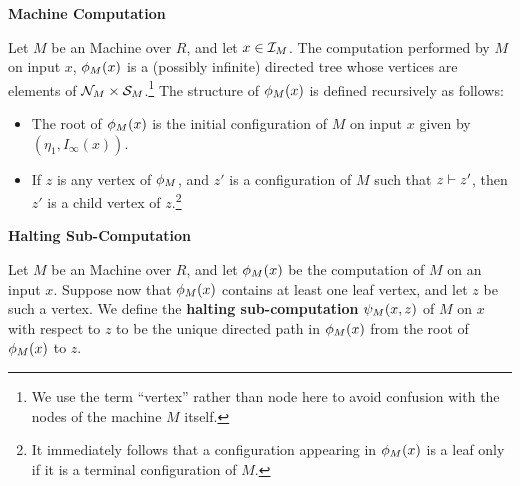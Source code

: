 \begin{definition}{\textbf{\ndet Machine Computation}}
  
  Let $M$ be an \ndet Machine over $R$, and let $x \in \mathcal{I}_M$.
  The computation performed by $M$ on input $x$, $\phi_M(x)$ is a
  (possibly infinite) directed tree whose vertices are elements of
  $\mathcal{N}_M \times \mathcal{S}_M$.\footnote{We use the term ``vertex''
    rather than node here to avoid confusion with the nodes of the
    machine $M$ itself.}  The structure of $\phi_M(x)$ is defined
  recursively as follows:
  
  \begin{itemize}
  \item The root of $\phi_M(x)$ is the initial configuration of
    $M$ on input $x$ given by $(\eta_1, I_\infty(x))$.
    
  \item If $z$ is any vertex of $\phi_M$, and $z'$ is a
    configuration of $M$ such that $z \vdash z'$, then $z'$ is a
    child vertex of $z$.\footnote{It immediately follows that a
      configuration appearing in $\phi_M(x)$ is a leaf only if it
      is a terminal configuration of $M$.}
  \end{itemize}
  
\end{definition}



\begin{definition}{\textbf{Halting Sub-Computation}}
  
  Let $M$ be an \ndet Machine over $R$, and let $\phi_M(x)$ be the
  computation of $M$ on an input $x$.  Suppose now that
  $\phi_M(x)$ contains at least one leaf vertex, and let $z$ be
  such a vertex.  We define the \textbf{halting sub-computation}
  $\psi_M(x, z)$ of $M$ on $x$ with respect to $z$ to be the
  unique directed path in $\phi_M(x)$ from the root of
  $\phi_M(x)$ to $z$.
  

\end{definition}

